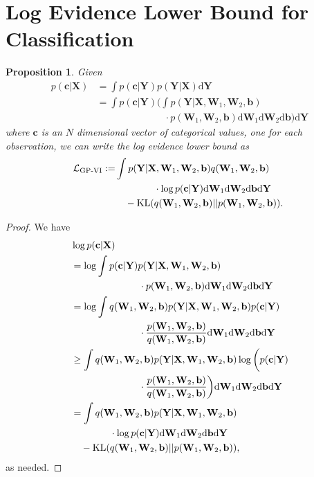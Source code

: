 \documentclass{article} %
\newcommand{\cL}{\mathcal{L}}
\newcommand{\td}{\text{d}}
\newcommand{\Bb}{\mathbf{b}}
\newcommand{\W}{\mathbf{W}}
\newcommand{\X}{\mathbf{X}}
\newcommand{\Y}{\mathbf{Y}}
\newcommand{\KL}{\text{KL}}
\newcommand{\bc}{\mathbf{c}}
\newtheorem{proposition}{Proposition}
\theoremstyle{definition}
\begin{document}
\section{Log Evidence Lower Bound for Classification}
\begin{proposition} \label{prop:lower_bound_class}
Given 
\begin{align*}
p(\bc | \X) &= \int p(\bc | \Y) p(\Y | \X) \td \Y \\
&= \int p(\bc | \Y) \bigg( \int p(\Y | \X, \W_1, \W_2, \Bb) \\
&\qquad\qquad\qquad\quad \cdot p(\W_1, \W_2, \Bb) \td \W_1 \td \W_2 \td \Bb \bigg) \td \Y
\end{align*}
where $\bc$ is an $N$ dimensional vector of categorical values, one for each observation, we can write the log evidence lower bound as
\begin{align*}
\hspace{-1mm}
\cL_{\text{GP-VI}} := &\int p(\Y|\X, \W_1, \W_2, \Bb) q(\W_1, \W_2, \Bb) \notag\\
&\qquad \qquad \cdot \log p(\bc | \Y) \td \W_1 \td \W_2 \td \Bb \td \Y  \notag\\
&\quad - \KL(q(\W_1, \W_2, \Bb) || p(\W_1, \W_2, \Bb)).
\end{align*}
\end{proposition}
\begin{proof}
We have 
\begin{align*}
&\log p(\bc | \X) \\
&= \log \int p(\bc | \Y) p(\Y | \X, \W_1, \W_2, \Bb) \\
&\qquad\qquad\qquad\quad \cdot p(\W_1, \W_2, \Bb) \td \W_1 \td \W_2 \td \Bb \td \Y \\
&= \log \int q(\W_1, \W_2, \Bb) p(\Y | \X, \W_1, \W_2, \Bb) p(\bc | \Y) \\
&\qquad\qquad\qquad\quad \cdot \frac{p(\W_1, \W_2, \Bb)}{q(\W_1, \W_2, \Bb)} \td \W_1 \td \W_2 \td \Bb \td \Y \\
&\geq \int q(\W_1, \W_2, \Bb) p(\Y | \X, \W_1, \W_2, \Bb) \log \bigg( p(\bc | \Y) \\
&\qquad\qquad\qquad\quad \cdot \frac{p(\W_1, \W_2, \Bb)}{q(\W_1, \W_2, \Bb)} \bigg) \td \W_1 \td \W_2 \td \Bb \td \Y \\
&= \int q(\W_1, \W_2, \Bb) p(\Y|\X, \W_1, \W_2, \Bb) \notag\\
&\qquad \qquad \cdot \log p(\bc | \Y) \td \W_1 \td \W_2 \td \Bb \td \Y  \notag\\
&\quad - \KL(q(\W_1, \W_2, \Bb) || p(\W_1, \W_2, \Bb)),
\end{align*}
as needed.
\end{proof}
\end{document}
